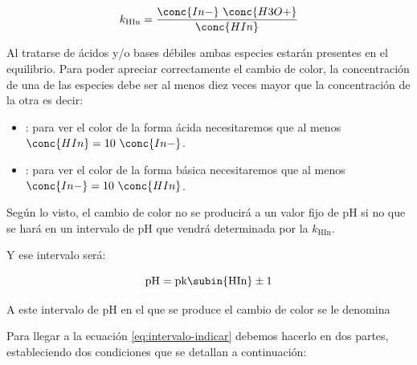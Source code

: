    \begin{equation}
        k_{\text{HIn}} = \dfrac{\conc{In-}\ \conc{H3O+}}{\conc{HIn}}
    \end{equation}

    Al tratarse de ácidos y/o bases débiles ambas especies estarán presentes en el equilibrio.
    Para poder apreciar correctamente el cambio de color, la concentración de una de las especies debe ser al menos diez veces mayor que la concentración de la otra es decir:
    \begin{itemize}
        \item {}: para ver el color de la forma ácida necesitaremos que al menos \(\conc{HIn} = 10\ \conc{In-}\).
        \item {}: para ver el color de la forma básica necesitaremos que al menos \(\conc{In-} = 10\ \conc{HIn}\).
    \end{itemize}

    Según lo visto, el cambio de color no se producirá a un valor fijo de pH si no que se hará en un intervalo de pH que vendrá determinada por la \(k_{\text{HIn}}\).

    Y ese intervalo será:

    \begin{equation}
        \text{pH} = \text{pk\subin{HIn}} \pm 1\label{eq:intervalo-indicar}
    \end{equation}

    A este intervalo de pH en el que se produce el cambio de color se le denomina 


    Para llegar a la ecuación \eqref{eq:intervalo-indicar} debemos hacerlo en dos partes, estableciendo dos condiciones que se detallan a continuación:

